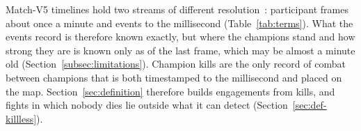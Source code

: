 Match-V5 timelines hold two streams of different resolution~\cite{riotapi2024timeline}: participant
frames about once a minute and events to the millisecond (Table~\ref{tab:terms}). What the events
record is therefore known exactly, but where the champions stand and how strong they are is known only
as of the last frame, which may be almost a minute old
(Section~\ref{subsec:limitations}). Champion kills are the only record of combat between champions that
is both timestamped to the millisecond and placed on the map. Section~\ref{sec:definition} therefore
builds engagements from kills, and fights in which nobody dies lie outside what it can detect
(Section~\ref{sec:def-killless}).

